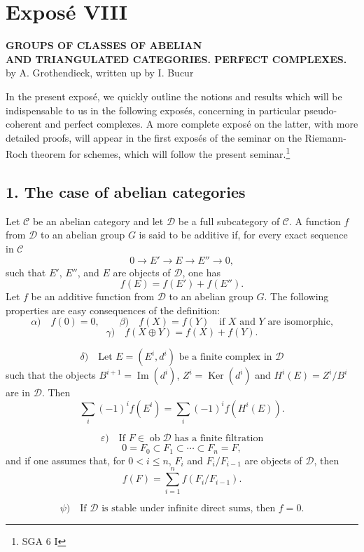 \documentclass[11pt]{article}
\providecommand{\Ob}{\operatorname{ob}}
\providecommand{\cC}{\mathcal C}
\providecommand{\Ob}{\operatorname{ob}}
\providecommand{\cC}{\mathcal C}
\providecommand{\cD}{\mathcal D}
\providecommand{\Ob}{\operatorname{Ob}}
\providecommand{\Ob}{\operatorname{ob}}
\providecommand{\Ob}{\operatorname{Ob}}
\begin{document}
\newpage
\section*{Exposé VIII}

\begin{center}
\textbf{GROUPS OF CLASSES OF ABELIAN}\\
\textbf{AND TRIANGULATED CATEGORIES. PERFECT COMPLEXES.}\\[1ex]
by A. Grothendieck, written up by I. Bucur
\end{center}

In the present exposé, we quickly outline the notions and results which will be indispensable to us in the following exposés, concerning in particular pseudo-coherent and perfect complexes. A more complete exposé on the latter, with more detailed proofs, will appear in the first exposés of the seminar on the Riemann-Roch theorem for schemes, which will follow the present seminar.\footnote{SGA 6 I}

\subsection*{1. The case of abelian categories}

Let $\cC$ be an abelian category and let $\cD$ be a full subcategory of $\cC$. A function $f$ from $\cD$ to an abelian group $G$ is said to be additive if, for every exact sequence in $\cC$
\[
0\longrightarrow E'\longrightarrow E\longrightarrow E''\longrightarrow 0,
\]
such that $E'$, $E''$, and $E$ are objects of $\cD$, one has
\[
f(E)=f(E')+f(E'').
\]
Let $f$ be an additive function from $\cD$ to an abelian group $G$. The following properties are easy consequences of the definition:
\[
\alpha)\quad f(0)=0,\qquad
\beta)\quad f(X)=f(Y)\quad\text{if }X\text{ and }Y\text{ are isomorphic,}
\]
\[
\gamma)\quad f(X\oplus Y)=f(X)+f(Y).
\]

\[
\delta)\quad
\text{Let }E=(E^i,d^i)\text{ be a finite complex in }\cD
\]
such that the objects $B^{i+1}=\operatorname{Im}(d^i)$, $Z^i=\operatorname{Ker}(d^i)$ and $H^i(E)=Z^i/B^i$ are in $\cD$. Then
\[
\sum_i (-1)^i f(E^i)=\sum_i (-1)^i f(H^i(E)).
\]

\[
\varepsilon)\quad
\text{If }F\in\Ob \cD\text{ has a finite filtration}
\]
\[
0=F_0\subset F_1\subset\cdots\subset F_n=F,
\]
and if one assumes that, for $0<i\le n$, $F_i$ and $F_i/F_{i-1}$ are objects of $\cD$, then
\[
f(F)=\sum_{i=1}^n f(F_i/F_{i-1}).
\]

\[
\psi)\quad
\text{If }\cD\text{ is stable under infinite direct sums, then }f=0.
\]
\end{document}
